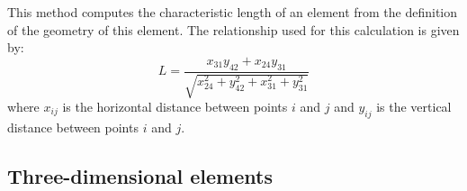 This method computes the characteristic length of an element from the definition of the geometry of this element.
The relationship used for this calculation is given by:
\begin{equation}
L=\frac{x_{31} y_{42}+x_{24} y_{31}}{\sqrt{x_{24}^2+y_{42}^2+x_{31}^2+y_{31}^2}} 
\end{equation}
where $x_{ij}$ is the horizontal distance between points $i$ and $j$ and $y_{ij}$ is the vertical distance between points $i$ and $j$.

\subsection{Three-dimensional elements}
